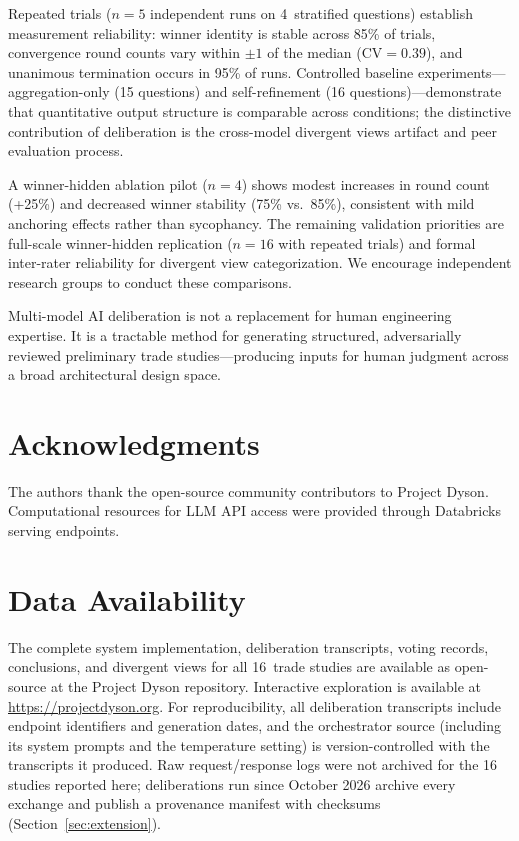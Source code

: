 \documentclass[11pt,a4paper]{article}
\begin{document}
Repeated trials ($n = 5$ independent runs on 4~stratified questions) establish measurement reliability: winner identity is stable across 85\% of trials, convergence round counts vary within $\pm 1$ of the median ($\text{CV} = 0.39$), and unanimous termination occurs in 95\% of runs. Controlled baseline experiments---aggregation-only (15 questions) and self-refinement (16 questions)---demonstrate that quantitative output structure is comparable across conditions; the distinctive contribution of deliberation is the cross-model divergent views artifact and peer evaluation process.

A winner-hidden ablation pilot ($n=4$) shows modest increases in round count (+25\%) and decreased winner stability (75\% vs.\ 85\%), consistent with mild anchoring effects rather than sycophancy. The remaining validation priorities are full-scale winner-hidden replication ($n=16$ with repeated trials) and formal inter-rater reliability for divergent view categorization. We encourage independent research groups to conduct these comparisons.

Multi-model AI deliberation is not a replacement for human engineering expertise. It is a tractable method for generating structured, adversarially reviewed preliminary trade studies---producing inputs for human judgment across a broad architectural design space.

\section*{Acknowledgments}

The authors thank the open-source community contributors to Project Dyson. Computational resources for LLM API access were provided through Databricks serving endpoints.

\section*{Data Availability}

The complete system implementation, deliberation transcripts, voting records, conclusions, and divergent views for all 16~trade studies are available as open-source at the Project Dyson repository. Interactive exploration is available at \url{https://projectdyson.org}. For reproducibility, all deliberation transcripts include endpoint identifiers and generation dates, and the orchestrator source (including its system prompts and the temperature setting) is version-controlled with the transcripts it produced. Raw request/response logs were not archived for the 16 studies reported here; deliberations run since October 2026 archive every exchange and publish a provenance manifest with checksums (Section~\ref{sec:extension}).
\end{document}

